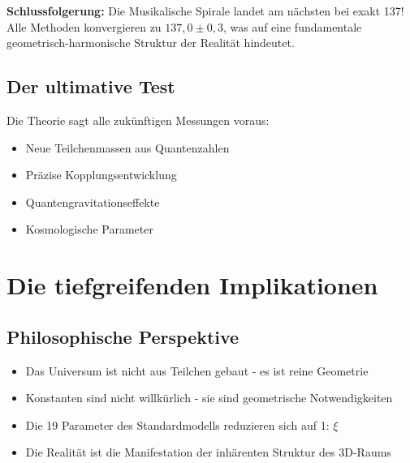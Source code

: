 \documentclass[12pt,a4paper]{article}
\theoremstyle{definition}
\begin{document}
	\begin{table}[h]
		\centering
		\caption{Detailanalyse der verschiedenen Ansätze}
	\end{table}
	
	\textbf{Schlussfolgerung:} Die Musikalische Spirale landet am nächsten bei exakt 137! Alle Methoden konvergieren zu $137,0 \pm 0,3$, was auf eine fundamentale geometrisch-harmonische Struktur der Realität hindeutet.
	
	\subsection{Der ultimative Test}
	
	Die Theorie sagt alle zukünftigen Messungen voraus:
	\begin{itemize}
		\item Neue Teilchenmassen aus Quantenzahlen
		\item Präzise Kopplungsentwicklung
		\item Quantengravitationseffekte
		\item Kosmologische Parameter
	\end{itemize}
	
	\section{Die tiefgreifenden Implikationen}
	
	\subsection{Philosophische Perspektive}
	
	\begin{neueperspektive}
		\begin{itemize}
			\item Das Universum ist nicht aus Teilchen gebaut - es ist reine Geometrie
			\item Konstanten sind nicht willkürlich - sie sind geometrische Notwendigkeiten
			\item Die 19 Parameter des Standardmodells reduzieren sich auf 1: $\xi$
			\item Die Realität ist die Manifestation der inhärenten Struktur des 3D-Raums
		\end{itemize}
	\end{neueperspektive}
	
\end{document}
